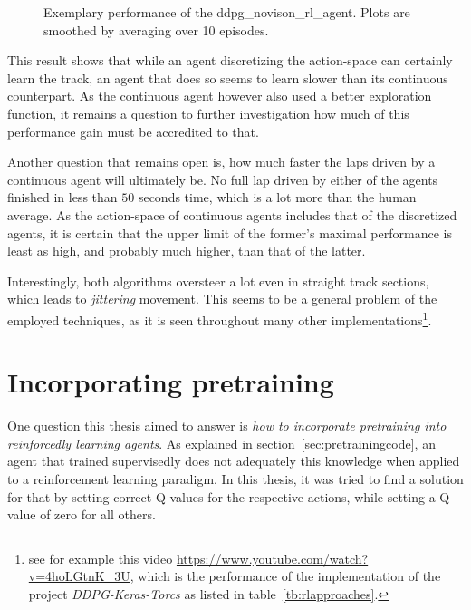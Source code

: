 \begin{figure}[h!]
	{%
		\setlength{\fboxsep}{0pt}%
		\setlength{\fboxrule}{1pt}%
	}%
	\centering
	\caption[Exemplary performance of the ddpg\_novison\_rl\_agent]{Exemplary performance of the ddpg\_novison\_rl\_agent. Plots are smoothed by averaging over 10 episodes.}
	\label{fig:ddpg_result}
\end{figure}


This result shows that while an agent discretizing the action-space can certainly learn the track, an agent that does so seems to learn slower than its continuous counterpart. As the continuous agent however also used a better exploration function, it remains a question to further investigation how much of this performance gain must be accredited to that. 

Another question that remains open is, how much faster the laps driven by a continuous agent will ultimately be. No full lap driven by either of the agents finished in less than $50$ seconds time, which is a lot more than the human average. As the action-space of continuous agents includes that of the discretized agents, it is certain that the upper limit of the former's maximal performance is least as high, and probably much higher, than that of the latter.

Interestingly, both algorithms oversteer a lot even in straight track sections, which leads to \textit{jittering} movement. This seems to be a general problem of the employed techniques, as it is seen throughout many other implementations\footnote{see for example this video \url{https://www.youtube.com/watch?v=4hoLGtnK_3U}, which is the performance of the implementation of the project \textit{DDPG-Keras-Torcs} as listed in table~\ref{tb:rlapproaches}.}.


\section{Incorporating pretraining}
\label{sec:incorporatePre}

One question this thesis aimed to answer is \textit{how to incorporate pretraining into reinforcedly learning agents}. As explained in section~\ref{sec:pretrainingcode}, an agent that trained supervisedly does not adequately  this knowledge when applied to a reinforcement learning paradigm. In this thesis, it was tried to find a solution for that by setting correct Q-values for the respective actions, while setting a Q-value of zero for all others.

